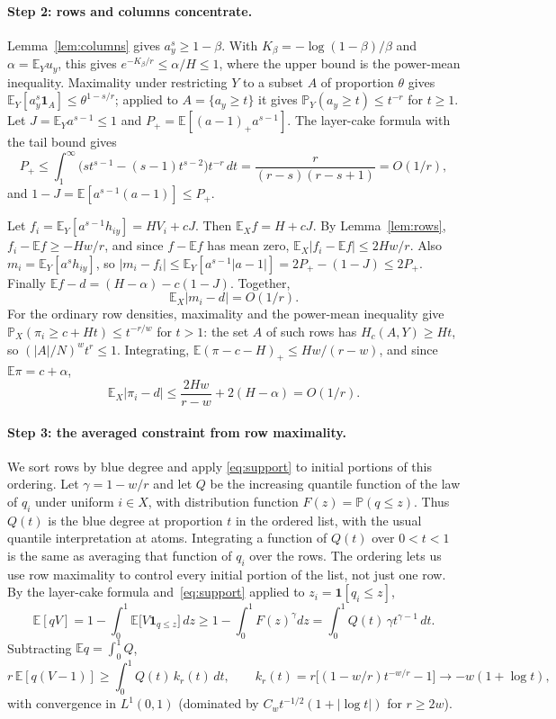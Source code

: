 \documentclass[11pt]{article}
\theoremstyle{definition}
\theoremstyle{remark}
\newcommand{\E}{\mathbb{E}}
\newcommand{\Prob}{\mathbb{P}}
\begin{document}
\paragraph{Step 2: rows and columns concentrate.} Lemma~\ref{lem:columns} gives $a_y^s\ge1-\beta$. With
$K_\beta=-\log(1-\beta)/\beta$ and $\alpha=\E_Yu_y$, this gives $e^{-K_\beta/r}\le\alpha/H\le1$, where the upper bound is
the power-mean inequality. Maximality under restricting $Y$ to a subset $A$ of proportion $\theta$ gives
$\E_Y[a_y^s\mathbf 1_A]\le\theta^{1-s/r}$; applied to $A=\{a_y\ge t\}$ it gives $\Prob_Y(a_y\ge t)\le t^{-r}$ for
$t\ge1$. Let $J=\E_Ya^{s-1}\le1$ and $P_+=\E[(a-1)_+a^{s-1}]$. The layer-cake formula with the tail bound gives
\[
P_+\le\int_1^\infty\big(st^{s-1}-(s-1)t^{s-2}\big)t^{-r}\,dt=\frac r{(r-s)(r-s+1)}=O(1/r),
\]
and $1-J=\E[a^{s-1}(a-1)]\le P_+$.

Let $f_i=\E_Y[a^{s-1}h_{iy}]=HV_i+cJ$. Then $\E_Xf=H+cJ$. By Lemma~\ref{lem:rows}, $f_i-\E f\ge-Hw/r$, and since
$f-\E f$ has mean zero, $\E_X|f_i-\E f|\le2Hw/r$. Also $m_i=\E_Y[a^sh_{iy}]$, so
$|m_i-f_i|\le\E_Y[a^{s-1}|a-1|]=2P_+-(1-J)\le2P_+$. Finally $\E f-d=(H-\alpha)-c(1-J)$. Together,
\begin{equation}\label{eq:C1}
\E_X|m_i-d|=O(1/r).
\end{equation}
For the ordinary row densities, maximality and the power-mean inequality give
$\Prob_X(\pi_i\ge c+Ht)\le t^{-r/w}$ for $t>1$: the set $A$ of such rows has $H_c(A,Y)\ge Ht$, so
$(|A|/N)^wt^r\le1$. Integrating, $\E(\pi-c-H)_+\le Hw/(r-w)$, and since $\E\pi=c+\alpha$,
\begin{equation}\label{eq:C2}
\E_X|\pi_i-d|\le\frac{2Hw}{r-w}+2(H-\alpha)=O(1/r).
\end{equation}

\paragraph{Step 3: the averaged constraint from row maximality.} We sort rows by blue degree and apply
\eqref{eq:support} to initial portions of this ordering.
Let $\gamma=1-w/r$ and let $Q$ be the increasing quantile function of the law of $q_i$
under uniform $i\in X$, with distribution function $F(z)=\Prob(q\le z)$. Thus $Q(t)$ is the blue degree at
proportion $t$ in the ordered list, with the usual quantile interpretation at atoms. Integrating a function
of $Q(t)$ over $0<t<1$ is the same as averaging that function of $q_i$ over the rows.
The ordering lets us use row maximality to control every initial portion of the list, not just one row.
By the layer-cake formula and~\eqref{eq:support}
applied to $z_i=\mathbf 1[q_i\le z]$,
\[
\E[qV]=1-\int_0^1\E\big[V\mathbf 1_{q\le z}\big]\,dz\ge1-\int_0^1F(z)^\gamma dz=\int_0^1Q(t)\,\gamma t^{\gamma-1}\,dt.
\]
Subtracting $\E q=\int_0^1Q$,
\begin{equation}\label{eq:D1}
r\,\E[q(V-1)]\ge\int_0^1Q(t)\,k_r(t)\,dt,\qquad k_r(t)=r\big[(1-w/r)t^{-w/r}-1\big]\longrightarrow-w(1+\log t),
\end{equation}
with convergence in $L^1(0,1)$ (dominated by $C_wt^{-1/2}(1+|\log t|)$ for $r\ge2w$).
\end{document}
